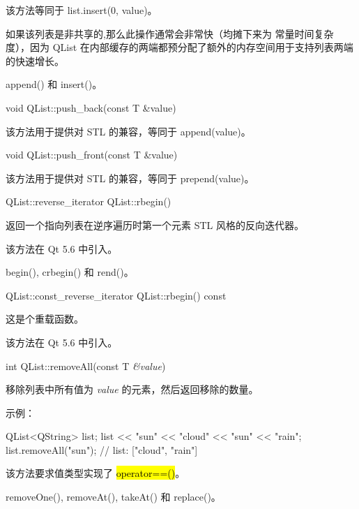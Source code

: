 该方法等同于 list.insert(0, value)。

如果该列表是非共享的,那么此操作通常会非常快（均摊下来为 常量时间复杂度），因为 QList 在内部缓存的两端都预分配了额外的内存空间用于支持列表两端的快速增长。


\begin{seeAlso}
append() 和 insert()。
\end{seeAlso}

void QList::push\_back(const T \&value)

该方法用于提供对 STL 的兼容，等同于 append(value)。

void QList::push\_front(const T \&value)

该方法用于提供对 STL 的兼容，等同于 prepend(value)。

QList::reverse\_iterator QList::rbegin()

返回一个指向列表在逆序遍历时第一个元素 STL 风格的反向迭代器。

该方法在 Qt 5.6 中引入。

\begin{seeAlso}
begin(), crbegin() 和 rend()。
\end{seeAlso}

QList::const\_reverse\_iterator QList::rbegin() const

这是个重载函数。

该方法在 Qt 5.6 中引入。

int QList::removeAll(const T \emph{\&value})

移除列表中所有值为 \emph{value} 的元素，然后返回移除的数量。

示例：

\begin{cppcode}
QList<QString> list;
list << "sun" << "cloud" << "sun" << "rain";
list.removeAll("sun");
// list: ["cloud", "rain"]
\end{cppcode}

该方法要求值类型实现了 \hl{operator==()}。

\begin{seeAlso}
removeOne(), removeAt(), takeAt() 和 replace()。
\end{seeAlso}

